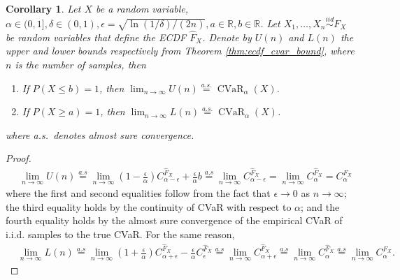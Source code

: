 \documentclass[acmlarge, manuscript, screen, review, natbib=false, oneside]{acmart}
\newtheorem{corollary}[theorem]{Corollary}
\DeclareMathOperator{\CVaR}{CVaR}
\begin{document}
\begin{corollary}\label{prf:x_concentration_bound_asymptotic_convergence}
	Let $X$ be a random variable, $\alpha\in (0, 1],\delta \in (0, 1), \epsilon=\sqrt{\ln(1/\delta)/(2n)}, a\in \mathbb{R}, b\in \mathbb{R}$. Let $X_1, \dots, X_n \overset{iid}{\sim} F_X$ be random variables that define the ECDF $\hat{F}_X$. Denote by $U(n)$ and $L(n)$ the upper and lower bounds respectively from Theorem \ref{thm:ecdf_cvar_bound}, where $n$ is the number of samples, then
	\begin{enumerate}
		\item If $P(X\leq b)=1$, then $\lim_{n\rightarrow \infty} U(n)\overset{a.s.}{=}\CVaR_\alpha(X)$.
		\item If $P(X\geq a)=1$, then $\lim_{n\rightarrow \infty} L(n)\overset{a.s.}{=}\CVaR_\alpha(X)$.
	\end{enumerate}
	where a.s.~denotes almost sure convergence.
\end{corollary}
\begin{proof}
	\begin{equation}
		\begin{aligned}
			&\lim_{n \to \infty} U(n)\overset{a.s}{=} \lim_{n \to \infty} (1-\frac{\epsilon}{\alpha})C_{\alpha-\epsilon}^{\hat{F}_X} + \frac{\epsilon}{\alpha}b 
			\overset{a.s}{=}\lim_{n \to \infty} C_{\alpha-\epsilon}^{\hat{F}_X}=\lim_{n \to \infty} C_{\alpha}^{\hat{F}_X} = C_{\alpha}^{F_X}
		\end{aligned}
	\end{equation}
	where the first and second equalities follow from the fact that $\epsilon \to 0$ as $n \to \infty$; the third equality holds by the continuity of CVaR with respect to $\alpha$; and the fourth equality holds by the almost sure convergence of the empirical CVaR of i.i.d. samples to the true CVaR. For the same reason,
	\begin{equation}
		\begin{aligned}
			&\lim_{n\rightarrow \infty} L(n)\overset{a.s}{=} \lim_{n\rightarrow \infty} (1+\frac{\epsilon}{\alpha})C_{\alpha+\epsilon}^{\hat{F}_X}-\frac{\epsilon}{\alpha}C_{\epsilon}^{\hat{F}_X} 
			\overset{a.s}{=} \lim_{n\rightarrow \infty} C_{\alpha+\epsilon}^{\hat{F}_X}
			\overset{a.s}{=} \lim_{n\rightarrow \infty} C_{\alpha}^{\hat{F}_X}
			\overset{a.s}{=} \lim_{n\rightarrow \infty} C_{\alpha}^{F_X}.
		\end{aligned}
	\end{equation}
\end{proof}
\end{document}
